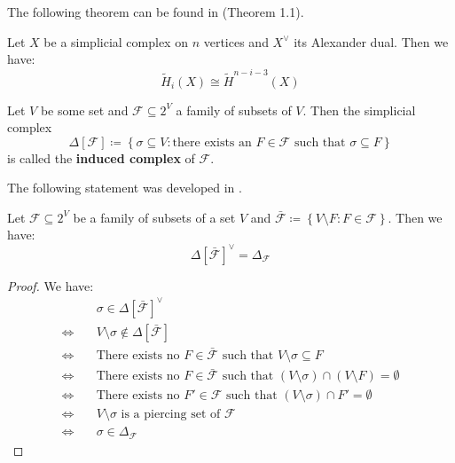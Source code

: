 The following theorem can be found in \cite{8} (Theorem 1.1).

\begin{thm}\label{theorem12}
Let \(X\) be a simplicial complex on \(n\) vertices and \(X^{\lor}\) its Alexander dual. Then we have:
\[
\tilde{H}_i(X)\cong\tilde{H}^{n-i-3}(X)
\]
\end{thm}

\begin{defi}
Let \(V\) be some set and \(\mathcal{F}\subseteq 2^V\) a family of subsets of \(V\). Then the simplicial complex
\[
\Delta\left[\mathcal{F}\right]\coloneqq \left\{\sigma\subseteq V:\text{there exists an }F\in\mathcal{F}\text{ such that }\sigma\subseteq F\right\}
\]
is called the \textbf{induced complex} of \(\mathcal{F}\). 
\end{defi}

The following statement was developed in \cite{9}.

\begin{prop}\label{proposition13}
Let \(\mathcal{F}\subseteq 2^V\) be a family of subsets of a set \(V\) and \(\bar{\mathcal{F}}\coloneqq \left\{V\setminus F:F\in\mathcal{F}\right\}\). Then we have:
\[
\Delta\left[\bar{\mathcal{F}}\right]^{\lor}=\Delta_{\mathcal{F}}
\]
\begin{proof}
We have:
\begin{align*}
  & \sigma\in\Delta\left[\bar{\mathcal{F}}\right]^{\lor} \\
  \Longleftrightarrow \quad & V\setminus\sigma\notin\Delta\left[\bar{\mathcal{F}}\right] \\
  \Longleftrightarrow \quad & \text{There exists no } F\in\bar{\mathcal{F}}\text{ such that }V\setminus\sigma\subseteq F \\
  \Longleftrightarrow \quad & \text{There exists no } F\in\bar{\mathcal{F}}\text{ such that }(V\setminus\sigma)\cap(V\setminus F)=\emptyset \\
  \Longleftrightarrow \quad & \text{There exists no } F'\in\mathcal{F}\text{ such that }(V\setminus\sigma)\cap F'=\emptyset \\
  \Longleftrightarrow \quad & V\setminus\sigma\text{ is a piercing set of }\mathcal{F} \\
  \Longleftrightarrow \quad & \sigma\in\Delta_{\mathcal{F}}
 \end{align*}
\end{proof}
\end{prop}

